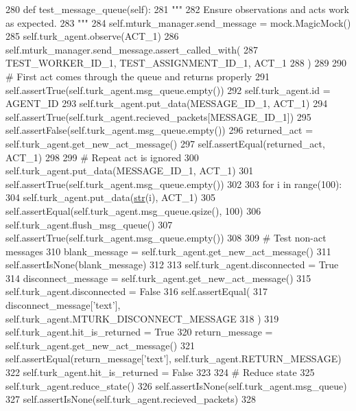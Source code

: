 \begin{DoxyCode}
280     \textcolor{keyword}{def }test\_message\_queue(self):
281         \textcolor{stringliteral}{"""}
282 \textcolor{stringliteral}{        Ensure observations and acts work as expected.}
283 \textcolor{stringliteral}{        """}
284         self.mturk\_manager.send\_message = mock.MagicMock()
285         self.turk\_agent.observe(ACT\_1)
286         self.mturk\_manager.send\_message.assert\_called\_with(
287             TEST\_WORKER\_ID\_1, TEST\_ASSIGNMENT\_ID\_1, ACT\_1
288         )
289 
290         \textcolor{comment}{# First act comes through the queue and returns properly}
291         self.assertTrue(self.turk\_agent.msg\_queue.empty())
292         self.turk\_agent.id = AGENT\_ID
293         self.turk\_agent.put\_data(MESSAGE\_ID\_1, ACT\_1)
294         self.assertTrue(self.turk\_agent.recieved\_packets[MESSAGE\_ID\_1])
295         self.assertFalse(self.turk\_agent.msg\_queue.empty())
296         returned\_act = self.turk\_agent.get\_new\_act\_message()
297         self.assertEqual(returned\_act, ACT\_1)
298 
299         \textcolor{comment}{# Repeat act is ignored}
300         self.turk\_agent.put\_data(MESSAGE\_ID\_1, ACT\_1)
301         self.assertTrue(self.turk\_agent.msg\_queue.empty())
302 
303         \textcolor{keywordflow}{for} i \textcolor{keywordflow}{in} range(100):
304             self.turk\_agent.put\_data(\hyperlink{namespacegenerate__task__READMEs_a5b88452ffb87b78c8c85ececebafc09f}{str}(i), ACT\_1)
305         self.assertEqual(self.turk\_agent.msg\_queue.qsize(), 100)
306         self.turk\_agent.flush\_msg\_queue()
307         self.assertTrue(self.turk\_agent.msg\_queue.empty())
308 
309         \textcolor{comment}{# Test non-act messages}
310         blank\_message = self.turk\_agent.get\_new\_act\_message()
311         self.assertIsNone(blank\_message)
312 
313         self.turk\_agent.disconnected = \textcolor{keyword}{True}
314         disconnect\_message = self.turk\_agent.get\_new\_act\_message()
315         self.turk\_agent.disconnected = \textcolor{keyword}{False}
316         self.assertEqual(
317             disconnect\_message[\textcolor{stringliteral}{'text'}], self.turk\_agent.MTURK\_DISCONNECT\_MESSAGE
318         )
319         self.turk\_agent.hit\_is\_returned = \textcolor{keyword}{True}
320         return\_message = self.turk\_agent.get\_new\_act\_message()
321         self.assertEqual(return\_message[\textcolor{stringliteral}{'text'}], self.turk\_agent.RETURN\_MESSAGE)
322         self.turk\_agent.hit\_is\_returned = \textcolor{keyword}{False}
323 
324         \textcolor{comment}{# Reduce state}
325         self.turk\_agent.reduce\_state()
326         self.assertIsNone(self.turk\_agent.msg\_queue)
327         self.assertIsNone(self.turk\_agent.recieved\_packets)
328 
\end{DoxyCode}
